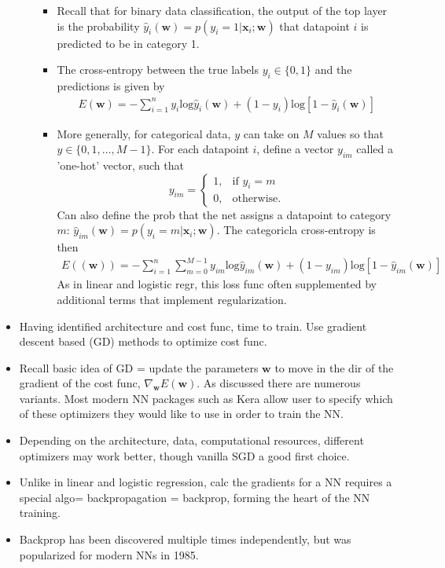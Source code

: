 \documentclass[norsk,a4paper,11pt]{article}
\begin{document}
\begin{itemize}
\begin{itemize}
\begin{itemize}
			\item Recall that for binary data classification, the output of the top layer is the probability $\hat{y}_i(\bm{w}) = p(y_i = 1 | \bm{x}_i ; \bm{w})$ that datapoint $i$ is predicted to be in category 1.
			\item The cross-entropy between the true labels $y_i \in \{0,1\}$ and the predictions is given by 
			\begin{align}
				E(\bm{w}) = - \sum_{i=1}^n y_i \text{log} \hat{y}_i (\bm{w}) + (1-y_i)\text{log} [1 - \hat{y}_i (\bm{w})]
			\end{align} 
			\item More generally, for categorical data, $y$ can take on $M$ values so that $y \in \{ 0, 1, ..., M-1 \}$. For each datapoint $i$, define a vector $y_{im}$ called a 'one-hot' vector, such that
			\[ y_{im} = \begin{cases}
				 1, & \text{if } y_{i} = m \\
				 0, & \text{otherwise.}  
			\end{cases} \]
			Can also define the prob that the net assigns a datapoint to category $m$: $\hat{y}_{im}(\bm{w}) = p(y_i = m | \bm{x}_i ; \bm{w})$. The categoricla cross-entropy is then
			\begin{align}
				E((\bm{w})) = - \sum_{i=1}^n \sum_{m=0}^{M-1} y_{im} \text{log} \hat{y}_{im} (\bm{w}) + (1-y_{im}) \text{log} [1 - \hat{y}_{im} (\bm{w})]
			\end{align}
			As in linear and logistic regr, this loss func often supplemented by additional terms that implement regularization.
		\end{itemize}
	\end{itemize}
	\item Having identified architecture and cost func, time to train. Use gradient descent based (GD) methods to optimize cost func.
	\item Recall basic idea of GD = update the parameters $\bm{w}$ to move in the dir of the gradient of the cost func, $\nabla_{\bm{w}} E(\bm{w})$. As discussed there are numerous variants. Most modern NN packages such as Kera allow user to specify which of these optimizers they would like to use in order to train the NN.
	\item Depending on the architecture, data, computational resources, different optimizers may work better, though vanilla SGD a good first choice.
	\item Unlike in linear and logistic regression, calc the gradients for a NN requires a special algo= backpropagation = backprop, forming the heart of the NN training.
	\item Backprop has been discovered multiple times independently, but was popularized for modern NNs in 1985. 
\end{itemize}
\end{document}
